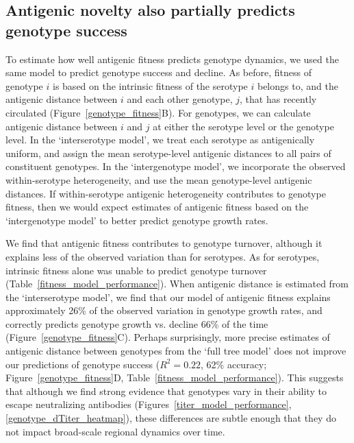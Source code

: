 \documentclass[11pt,oneside,letterpaper]{article}
\begin{document}
\subsection*{Antigenic novelty also partially predicts genotype success}
To estimate how well antigenic fitness predicts genotype dynamics, we used the same model to predict genotype success and decline.
As before, fitness of genotype $i$ is based on the intrinsic fitness of the serotype $i$ belongs to, and the antigenic distance between $i$ and each other genotype, $j$, that has recently circulated (Figure~\ref{genotype_fitness}B).
For genotypes, we can calculate antigenic distance between $i$ and $j$ at either the serotype level or the genotype level.
In the `interserotype model', we treat each serotype as antigenically uniform, and assign the mean serotype-level antigenic distances to all pairs of constituent genotypes.
In the `intergenotype model', we incorporate the observed within-serotype heterogeneity, and use the mean genotype-level antigenic distances.
If within-serotype antigenic heterogeneity contributes to genotype fitness, then we would expect estimates of antigenic fitness based on the `intergenotype model' to better predict genotype growth rates.

We find that antigenic fitness contributes to genotype turnover, although it explains less of the observed variation than for serotypes.
As for serotypes, intrinsic fitness alone was unable to predict genotype turnover (Table~\ref{fitness_model_performance}).
When antigenic distance is estimated from the `interserotype model', we find that our model of antigenic fitness explains approximately 26\% of the observed variation in genotype growth rates, and correctly predicts genotype growth vs. decline 66\% of the time (Figure~\ref{genotype_fitness}C).
Perhaps surprisingly, more precise estimates of antigenic distance between genotypes from the `full tree model' does not improve our predictions of genotype success ($R^2 = 0.22$, 62\% accuracy; Figure~\ref{genotype_fitness}D, Table~\ref{fitness_model_performance}).
This suggests that although we find strong evidence that genotypes vary in their ability to escape neutralizing antibodies (Figures~\ref{titer_model_performance}, \ref{genotype_dTiter_heatmap}), these differences are subtle enough that they do not impact broad-scale regional dynamics over time.
\end{document}
